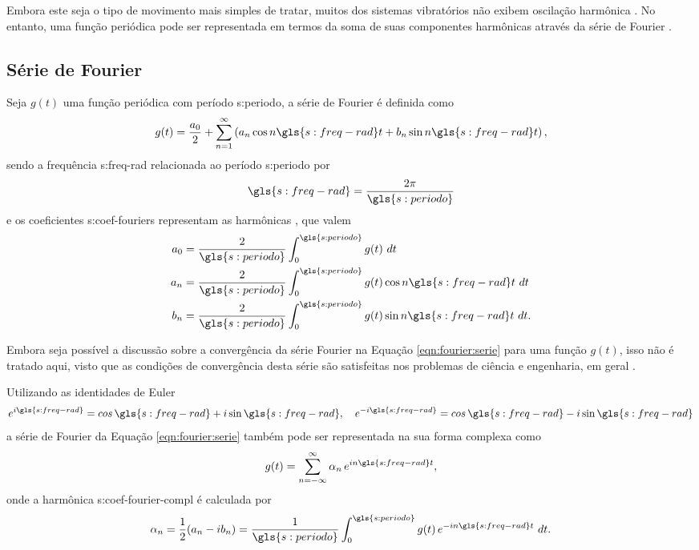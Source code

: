 \documentclass[12pt,oneside,english,brazil,lmodern,siglas,simbolos,cite=num]{ucsmonograph}
\begin{document}
	Embora este seja o tipo de movimento mais simples de tratar, muitos dos sistemas vibratórios não exibem oscilação harmônica \cite{rao:2008}.
	No entanto, uma função periódica pode ser representada em termos da soma de suas componentes harmônicas através da série de Fourier \cite{clark:1972}.
	
	\subsection{Série de Fourier} \label{sec:fourier:serie}
	Seja $g(t)$ uma função periódica com período \gls{s:periodo}, a série de Fourier é definida como \cite{spiegel:1977}
	\begin{equation}\label{eqn:fourier:serie}
		g(t) = \frac{a_0}{2} + \sum_{n=1}^{\infty}\left(a_n\cos n\gls{s:freq-rad} t + b_n\sin n\gls{s:freq-rad} t \right),
	\end{equation}
	sendo a frequência \gls{s:freq-rad} relacionada ao período \gls{s:periodo} por \cite{dimarogonas:1995}
	\begin{equation}\label{eqn:fourier:periodo}
		\gls{s:freq-rad} = \frac{2\pi}{\gls{s:periodo}}
	\end{equation}
	e os coeficientes \glspl{s:coef-fourier} representam as harmônicas \cite{dimarogonas:1995}, que valem \cite{spiegel:1977}
	\begin{align}\label{eqn:fourier:coefs}
		a_0 &= \frac{2}{\gls{s:periodo}}\int_{0}^{\gls{s:periodo}}g(t)\ dt \notag\\
		a_n &= \frac{2}{\gls{s:periodo}}\int_{0}^{\gls{s:periodo}}g(t)\cos n\gls{s:freq-rad} t\ dt \\
		b_n &= \frac{2}{\gls{s:periodo}}\int_{0}^{\gls{s:periodo}}g(t)\sin n\gls{s:freq-rad} t\ dt. \notag
	\end{align}
	
	Embora seja possível a discussão sobre a convergência da série Fourier na Equação \ref{eqn:fourier:serie} para uma função $g(t)$, isso não é tratado aqui, visto que as condições de convergência desta série são satisfeitas nos problemas de ciência e engenharia, em geral \cite{spiegel:1977}.
	
	Utilizando as identidades de Euler
	\begin{equation}\label{eqn:fourier:ident-euler}
		e^{i\gls{s:freq-rad}} = cos\,\gls{s:freq-rad} + i\sin\gls{s:freq-rad}, \quad e^{-i\gls{s:freq-rad}} = cos\,\gls{s:freq-rad} - i\sin\gls{s:freq-rad}
	\end{equation}
	a série de Fourier da Equação \ref{eqn:fourier:serie} também pode ser representada na sua forma complexa como \cite{spiegel:1977}
	\begin{equation}\label{eqn:fourier:serie-compl}
		g(t) = \sum_{n=-\infty}^{\infty}\alpha_n\,e^{in\gls{s:freq-rad} t},
	\end{equation}
	onde a harmônica \gls{s:coef-fourier-compl} é calculada por \cite{dimarogonas:1995}
	\begin{equation}\label{eqn:fourier:coefs-compl}
		\alpha_n = \frac{1}{2}(a_n - ib_n) = \frac{1}{\gls{s:periodo}}\int_{0}^{\gls{s:periodo}}g(t)\,e^{-in\gls{s:freq-rad} t}\ dt.
	\end{equation}
	
\end{document}
